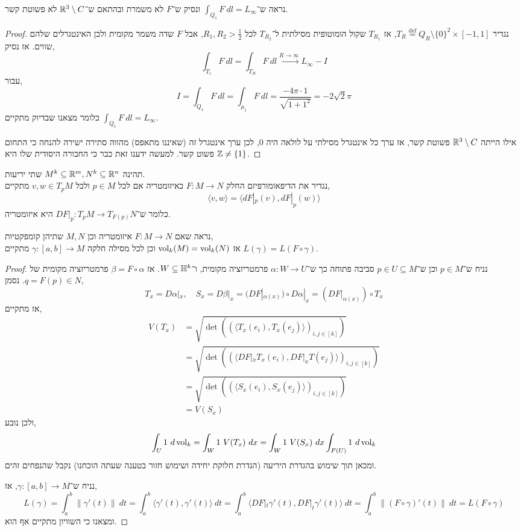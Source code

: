 \subquestion{}
נראה ש־$\int_{Q_1} F\ dl = L_{\infty}$ ונסיק ש־$F$ לא משמרת ובהתאם ש־$\mathbb{R}^3 \setminus C$ לא פשוטת קשר.
\begin{proof}
	נגדיר $T_R \overset{\operatorname{def}}{=} Q_R \setminus {\{ 0 \}}^2 \times [-1, 1]$, אז $T_{R_1}$ שקול הומוטופית מסילתית ל־$T_{R_2}$ לכל $R_1, R_2 > \frac{1}{2}$, אבל $F$ שדה משמר מקומית ולכן האינטגרלים שלהם שווים.
	אז נסיק,
	\[
		\int_{T_1} F\ dl
		= \int_{T_R} F\ dl
		\xrightarrow{R \to \infty} L_{\infty} - I
	\]
	עבור,
	\[
		I = \int_{Q_1} F\ dl
		= \int_{\mu_1} F\ dl
		= \frac{-4 \pi \cdot 1}{\sqrt{1 + 1^2}}
		= - 2 \sqrt{2} \pi
	\]
	כלומר מצאנו שבדיוק מתקיים $\int_{Q_1} F\ dl = L_{\infty}$.

	אילו הייתה $\mathbb{R}^3 \setminus C$ פשוטת קשר, אז ערך כל אינטגרל מסילתי על לולאה היה $0$, לכן ערך אינטגרל זה (שאיננו מתאפס) מהווה סתירה ישירה להנחה כי התחום פשוט קשר.
	למעשה ידענו זאת כבר כי החבורה היסודית שלו היא $\mathbb{Z} \ne \{ 1 \}$.
\end{proof}

\question{}
תהינה $M^k \subseteq \mathbb{R}^m, N^k \subseteq \mathbb{R}^n$ שתי יריעות. \\
נגדיר את הדיפאומורפיזם החלק $F : M \to N$ כאיזומטריה אם לכל $p \in M$ ולכל $v, w \in T_p M$ מתקיים,
\[
	\langle v, w \rangle
	= \langle d F |_p (v), d F |_p (w) \rangle
\]
כלומר ש־$DF |_p : T_p M \to T_{F(p)} N$ היא איזומטריה.

\subquestion{}
נראה שאם $F : M \to N$ איזומטריה וכן $M, N$ שתיהן קומפקטיות, \\
אז $\operatorname{vol}_k(M) = \operatorname{vol}_k(N)$ וכן לכל מסילה חלקה $\gamma : [a, b] \to M$ מתקיים $L(\gamma) = L(F \circ \gamma)$.
\begin{proof}
	נניח ש־$p \in M$ וכן ש־$p \in U \subseteq M$ סביבה פתוחה כך ש־$\alpha : W \to U$ פרמטריזציה מקומית, ו־$W \subseteq \mathbb{H}^k$.
	אז $\beta = F \circ \alpha$ פרמטריזציה מקומית של $q = F(p) \in N$.
	נסמן,
	\[
		T_x = D \alpha |_x,
		\quad
		S_x
		= D \beta |_x
		= (D F |_{\alpha(x)}) \circ D \alpha |_x
		= (D F |_{\alpha(x)}) \circ T_x
	\]
	אז מתקיים,
	\begin{align*}
		V(T_x)
		& = \sqrt{\det\left({(\langle T_x(e_i), T_x(e_j) \rangle)}_{i, j \in [k]}\right)} \\
		& = \sqrt{\det\left({(\langle D F |_x T_x(e_i), D F |_x T(e_j) \rangle)}_{i, j \in [k]}\right)} \\
		& = \sqrt{\det\left({(\langle S_x(e_i), S_x(e_j) \rangle)}_{i, j \in [k]}\right)} \\
		& = V(S_x)
	\end{align*}
	ולכן נובע,
	\[
		\int_U 1\ d\operatorname{vol}_k
		= \int_{W} 1\ V(T_x)\ dx
		= \int_{W} 1\ V(S_x)\ dx
		\int_{F(U)} 1\ d\operatorname{vol}_k
	\]
	ומכאן תוך שימוש בהגדרת היריעה (הגדרת חלוקת יחידה ושימוש חזור בטענה שעתה הוכחנו) נקבל שהנפחים זהים.

	נניח ש־$\gamma : [a, b] \to M$, אז,
	\[
		L(\gamma)
		= \int_{a}^{b} \lVert \gamma'(t) \rVert\ dt
		= \int_{a}^{b} \langle \gamma'(t), \gamma'(t) \rangle\ dt
		= \int_{a}^{b} \langle D F |_t \gamma'(t), D F |_t \gamma'(t) \rangle\ dt
		= \int_{a}^{b} \lVert (F \circ \gamma)'(t) \rVert\ dt
		= L(F \circ \gamma)
	\]
	ומצאנו כי השוויון מתקיים אף הוא.
\end{proof}

